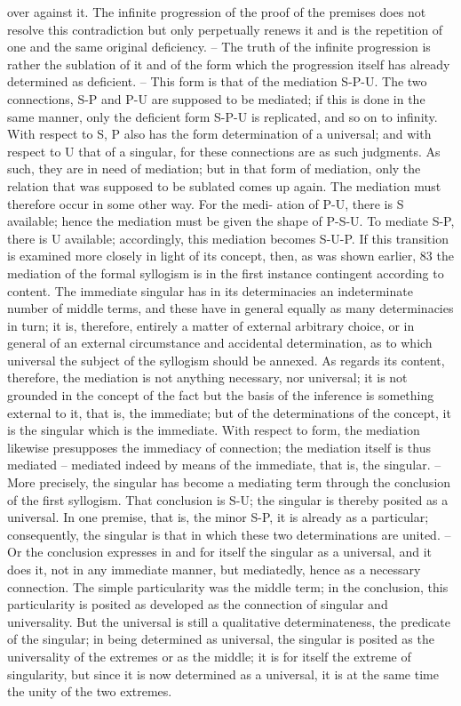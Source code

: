 over against it. The infinite progression of the proof of the premises does
not resolve this contradiction but only perpetually renews it and is the
repetition of one and the same original deficiency. – The truth of the
infinite progression is rather the sublation of it and of the form which the
progression itself has already determined as deficient. – This form is that
of the mediation S-P-U. The two connections, S-P and P-U are supposed
to be mediated; if this is done in the same manner, only the deficient form
S-P-U is replicated, and so on to infinity. With respect to S, P also has the
form determination of a universal; and with respect to U that of a singular,
for these connections are as such judgments. As such, they are in need
of mediation; but in that form of mediation, only the relation that was
supposed to be sublated comes up again.
The mediation must therefore occur in some other way. For the medi-
ation of P-U, there is S available; hence the mediation must be given the
shape of P-S-U. To mediate S-P, there is U available; accordingly, this
mediation becomes S-U-P.
If this transition is examined more closely in light of its concept, then,
as was shown earlier, 83 the mediation of the formal syllogism is in the first
instance contingent according to content. The immediate singular has in
its determinacies an indeterminate number of middle terms, and these
have in general equally as many determinacies in turn; it is, therefore,
entirely a matter of external arbitrary choice, or in general of an external
circumstance and accidental determination, as to which universal the subject
of the syllogism should be annexed. As regards its content, therefore, the
mediation is not anything necessary, nor universal; it is not grounded in
the concept of the fact but the basis of the inference is something external
to it, that is, the immediate; but of the determinations of the concept, it is
the singular which is the immediate.
With respect to form, the mediation likewise presupposes the immediacy
of connection; the mediation itself is thus mediated – mediated indeed
by means of the immediate, that is, the singular. – More precisely, the
singular has become a mediating term through the conclusion of the first
syllogism. That conclusion is S-U; the singular is thereby posited as a
universal. In one premise, that is, the minor S-P, it is already as a particular;
consequently, the singular is that in which these two determinations are
united. – Or the conclusion expresses in and for itself the singular as a
universal, and it does it, not in any immediate manner, but mediatedly,
hence as a necessary connection. The simple particularity was the middle
term; in the conclusion, this particularity is posited as developed as the
connection of singular and universality. But the universal is still a qualitative
determinateness, the predicate of the singular; in being determined as
universal, the singular is posited as the universality of the extremes or as
the middle; it is for itself the extreme of singularity, but since it is now
determined as a universal, it is at the same time the unity of the two
extremes.

